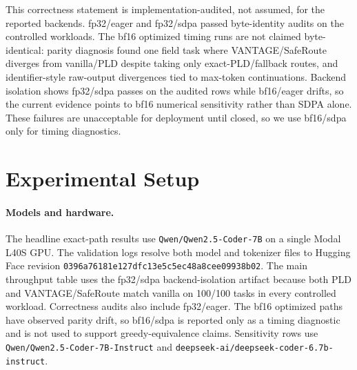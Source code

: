 \documentclass[11pt,a4paper]{article}
\begin{document}
This correctness statement is implementation-audited, not assumed, for the
reported backends. fp32/eager and fp32/sdpa passed byte-identity audits on the
controlled workloads. The bf16 optimized timing runs are not claimed
byte-identical: parity diagnosis found one field task where VANTAGE/SafeRoute diverges
from vanilla/PLD despite taking only exact-PLD/fallback routes, and
identifier-style raw-output divergences tied to max-token continuations.
Backend isolation shows fp32/sdpa passes on the audited rows while bf16/eager
drifts, so the current evidence points to bf16 numerical sensitivity rather
than SDPA alone. These failures are unacceptable for deployment until closed,
so we use bf16/sdpa only for timing diagnostics.

\section{Experimental Setup}
\label{sec:setup}

\paragraph{Models and hardware.}
The headline exact-path results use \texttt{Qwen/Qwen2.5-Coder-7B} on a single
Modal L40S GPU. The validation logs resolve both model and tokenizer
files to Hugging Face revision
\texttt{0396a76181e127dfc13e5c5ec48a8cee09938b02}. The main throughput
table uses the fp32/sdpa backend-isolation artifact because both PLD and
VANTAGE/SafeRoute match vanilla on 100/100 tasks in every controlled workload.
Correctness audits also include fp32/eager. The bf16 optimized paths have
observed parity drift, so bf16/sdpa is reported only as a timing diagnostic
and is not used to support greedy-equivalence claims.
Sensitivity rows use
\texttt{Qwen/Qwen2.5-Coder-7B-Instruct} and
\texttt{deepseek-ai/deepseek-coder-6.7b-instruct}.
\end{document}
